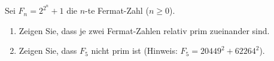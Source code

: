 
\begin{exercise}

Sei $F_n = 2^{2^n} + 1$ die $n$-te Fermat-Zahl ($n \geq 0$).

\begin{enumerate}[label = (\alph*)]
    \item Zeigen Sie, dass je zwei Fermat-Zahlen relativ prim zueinander sind.
    \item Zeigen Sie, dass $F_5$ nicht prim ist (Hinweis: $F_5 = 20449^2 + 62264^2$).
\end{enumerate}

\end{exercise}


\begin{solution}

\phantom{}

\end{solution}

